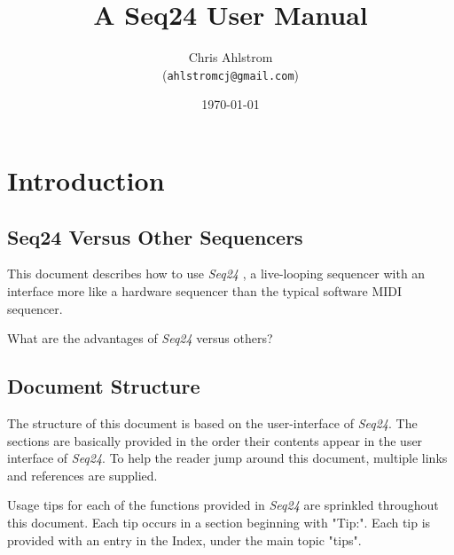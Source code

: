 \documentclass[
 11pt,
 twoside,
 a4paper,
 headinclude,
 footinclude,
 final                                 %
]{article}
\begin{document}
\title{A Seq24 User Manual}
\author{Chris Ahlstrom\\
   (\texttt{ahlstromcj@gmail.com})}
\date{\today}
\maketitle
\tableofcontents
\listoffigures                         %
\listoftables                          %


\setlength{\parindent}{0pt}
\setlength{\parskip}{1ex plus 0.5ex minus 0.2ex}

\section{Introduction}
\label{sec:introduction}

\subsection{Seq24 Versus Other Sequencers}
\label{subsec:introduction_seq24_vs_others}

   This document describes how to use \textsl{Seq24} \cite{seq24},
   a live-looping sequencer with an interface more like a hardware sequencer
   than the typical software MIDI sequencer.

   What are the advantages of
   \textsl{Seq24} versus others?

\subsection{Document Structure}
\label{subsec:introduction_document_structure}

   The structure of this document is based on the user-interface of
   \textsl{Seq24}.
   The sections are basically provided
   in the order their contents appear in the user interface of
   \textsl{Seq24}.  To help the reader jump around this document, multiple
   links and references are supplied.

   Usage tips
   for each of the functions provided in
   \textsl{Seq24} are sprinkled throughout this document.
   Each tip occurs in a section beginning with "Tip:".
   Each tip is provided with an entry in the Index, under the
   main topic "tips".
\end{document}
